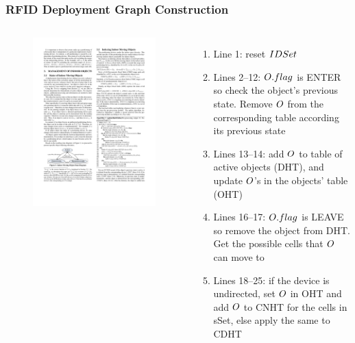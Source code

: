\begin{frame}
\frametitle{RFID Deployment Graph Construction}

\begin{columns}[c]

    \begin{figure}[tb]
      \includegraphics[width=\columnwidth]{figures/2-2/2-2-4.pdf}
    \end{figure}

  \scriptsize{
    \begin{enumerate}
      \item Line 1: \textrm{reset $\mathnormal{IDSet}$} \pause
      \item Lines 2--12: \textrm{$\mathnormal{O.flag}$ is ENTER so check the object's previous state. Remove $\mathnormal{O}$ from the corresponding table according its previous state} \pause
      \item Lines 13--14: \textrm{add $\mathnormal{O}$ to table of active objects (DHT), and update $\mathnormal{O}$'s in the objects' table (OHT)} \pause
      \item Lines 16--17: \textrm{$\mathnormal{O.flag}$ is LEAVE so remove the object from DHT. Get the possible cells that $\mathnormal{O}$ can move to} \pause
      \item Lines 18--25: \textrm{if the device is undirected, set $\mathnormal{O}$ in OHT and add $\mathnormal{O}$ to CNHT for the cells in sSet, else apply the same to CDHT}
    \end{enumerate}
  }
  \end{columns}


\end{frame}
